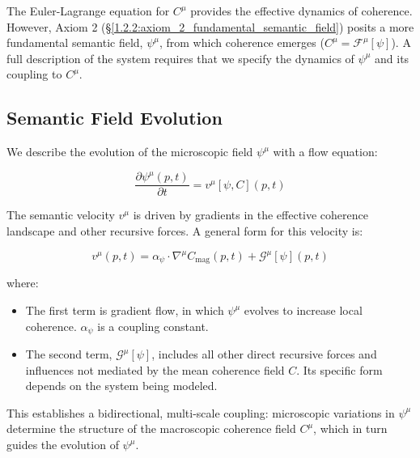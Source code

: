The Euler-Lagrange equation for \(C^\mu\) provides the effective dynamics of coherence. However, Axiom 2 (\S\ref{1.2.2:axiom_2_fundamental_semantic_field}) posits a more fundamental semantic field, \(\psi^\mu\), from which coherence emerges (\(C^\mu = \mathcal{F}^\mu[\psi]\)). A full description of the system requires that we specify the dynamics of \(\psi^\mu\) and its coupling to \(C^\mu\).


\subsection{Semantic Field Evolution}
\label{6.5.1:semantic_field_evolution}

We describe the evolution of the microscopic field \(\psi^\mu\) with a flow equation:

\begin{equation}
\frac{\partial \psi^\mu(p, t)}{\partial t} = v^\mu[\psi, C](p, t)
\end{equation}

The semantic velocity \(v^\mu\) is driven by gradients in the effective coherence landscape and other recursive forces. A general form for this velocity is:

\begin{equation}
v^\mu(p, t) = \alpha_{\psi} \cdot \nabla^\mu C_{\mathrm{mag}}(p, t) + \mathcal{G}^\mu[\psi](p, t)
\end{equation}

where:

\begin{itemize}

    \item The first term is gradient flow, in which \(\psi^\mu\) evolves to increase local coherence. \(\alpha_{\psi}\) is a coupling constant.
    
    \item The second term, \(\mathcal{G}^\mu[\psi]\), includes all other direct recursive forces and influences not mediated by the mean coherence field \(C\). Its specific form depends on the system being modeled.

\end{itemize}

This establishes a bidirectional, multi-scale coupling: microscopic variations in \(\psi^\mu\) determine the structure of the macroscopic coherence field \(C^\mu\), which in turn guides the evolution of \(\psi^\mu\).

